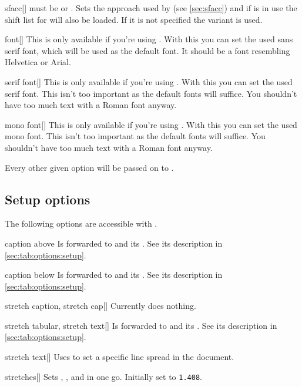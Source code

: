 \begin{describeopt}{sfacc}[]
   must be  or . Sets the approach used by
   (see \autoref{sec:sfacc}) and if  is in use the shift
  list for  will also be loaded. If it is not specified the
   variant is used.
\end{describeopt}
\begin{describeopt}{font}[]
  This is only available if you're using \luaxetex. With this you can set the
  used sans serif font, which will be used as the default font. It should be
  a font resembling Helvetica or Arial.
\end{describeopt}
\begin{describeopt}{serif font}[]
  This is only available if you're using \luaxetex. With this you can set the
  used serif font. This isn't too important as the default fonts will suffice.
  You shouldn't have too much text with a Roman font anyway.
\end{describeopt}
\begin{describeopt}{mono font}[]
  This is only available if you're using \luaxetex. With this you can set the
  used mono font. This isn't too important as the default fonts will suffice.
  You shouldn't have too much text with a Roman font anyway.
\end{describeopt}

\noindent
Every other given option will be passed on to .
\subsection{Setup options}\label{sec:alone:setup}%
The following options are accessible with .
\begin{describeopt}{caption above}
  Is forwarded to  and its . See its description in
  \autoref{sec:tab:options:setup}.
\end{describeopt}
\begin{describeopt}{caption below}
  Is forwarded to  and its . See its description in
  \autoref{sec:tab:options:setup}.
\end{describeopt}
\begin{describeopt}{stretch caption, stretch cap}[]
  Currently does nothing.
\end{describeopt}
\begin{describeopt}{stretch tabular, stretch text}[]
  Is forwarded to  and its . See its description in
  \autoref{sec:tab:options:setup}.
\end{describeopt}
\begin{describeopt}{stretch text}[]
  Uses  to set a specific line spread in the document.
\end{describeopt}
\begin{describeopt}{stretches}[]
  Sets , , and  in one go.
  Initially set to \texttt{1.408}.
\end{describeopt}

